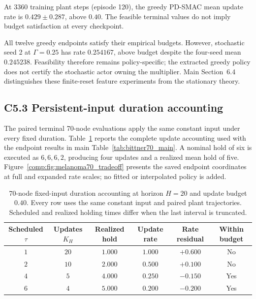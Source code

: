 \documentclass[11pt]{article}
\newcommand{\1}{\mathbf{1}}
\begin{document}
At 3360 training plant steps (episode 120), the greedy PD-SMAC mean update rate is $0.429\pm0.287$, above $0.40$. The feasible terminal values do not imply budget satisfaction at every checkpoint.

\begingroup{}

All twelve greedy endpoints satisfy their empirical budgets. However, stochastic seed 2 at $\Gamma=0.25$ has rate $0.254167$, above budget despite the four-seed mean $0.245238$. Feasibility therefore remains policy-specific; the extracted greedy policy does not certify the stochastic actor owning the multiplier. Main Section~6.4 distinguishes these finite-reset feature experiments from the stationary theory.


\endgroup

\subsection*{C5.3 Persistent-input duration accounting}
The paired terminal 70-node evaluations apply the same constant input under every fixed duration. Table~\ref{comp:tab:persistent_duration_accounting} reports the complete update accounting used with the endpoint results in main Table~\ref*{tab:bittner70_main}. A nominal hold of six is executed as $6,6,6,2$, producing four updates and a realized mean hold of five. Figure~\ref{comp:fig:melanoma70_tradeoff} presents the saved endpoint coordinates at full and expanded rate scales; no fitted or interpolated policy is added.

\begin{table}[tbp]
\caption{70-node fixed-input duration accounting at horizon $H=20$ and update budget $0.40$. Every row uses the same constant input and paired plant trajectories. Scheduled and realized holding times differ when the last interval is truncated.}
\label{comp:tab:persistent_duration_accounting}
\centering
\begingroup\small
\begin{tabular*}{\linewidth}{@{\extracolsep{\fill}}cccccc@{}}
\toprule
Scheduled $\tau$ & Updates $K_H$ & Realized hold & Update rate & Rate residual & Within budget \\
\midrule
$1$ & $20$ & $1.000$ & $1.000$ & $+0.600$ & No \\
$2$ & $10$ & $2.000$ & $0.500$ & $+0.100$ & No \\
$4$ & $5$ & $4.000$ & $0.250$ & $-0.150$ & Yes \\
$6$ & $4$ & $5.000$ & $0.200$ & $-0.200$ & Yes \\
\bottomrule
\end{tabular*}
\endgroup
\end{table}
\end{document}
